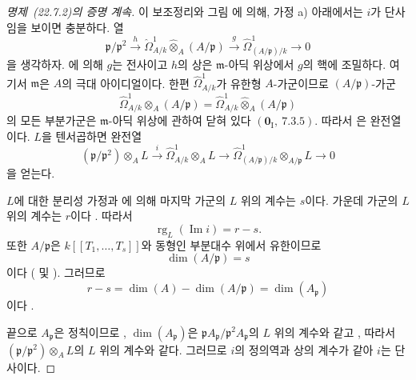 \begin{proof}[명제~{\rm(22.7.2)}의 증명 계속]
이 보조정리와 그림 에 의해, 가정 a) 아래에서는
$i$가 단사임을 보이면 충분하다. 열
\begin{equation}
\label{0.22.7.2.6-ko}
  \mathfrak p/\mathfrak p^2\xrightarrow{h}
  \widehat\Omega^1_{A/k}\widehat\otimes_A(A/\mathfrak p)
  \xrightarrow{g}\widehat\Omega^1_{(A/\mathfrak p)/k}\longrightarrow0
  \tag{22.7.2.6}
\end{equation}
을 생각하자. 에 의해 $g$는 전사이고 $h$의 상은
$\mathfrak m$-아딕 위상에서 $g$의 핵에 조밀하다. 여기서
$\mathfrak m$은 $A$의 극대 아이디얼이다. 한편
$\widehat\Omega^1_{A/k}$가 유한형 $A$-가군이므로
$(A/\mathfrak p)$-가군
\[
  \widehat\Omega^1_{A/k}\otimes_A(A/\mathfrak p)
  =\widehat\Omega^1_{A/k}\widehat\otimes_A(A/\mathfrak p)
\]
의 모든 부분가군은 $\mathfrak m$-아딕 위상에 관하여 닫혀 있다
$(\mathbf 0_{\mathrm I},~7.3.5)$. 따라서
은 완전열이다. $L$을 텐서곱하면 완전열
\[
  (\mathfrak p/\mathfrak p^2)\otimes_AL\xrightarrow{i}
  \widehat\Omega^1_{A/k}\otimes_AL\longrightarrow
  \widehat\Omega^1_{(A/\mathfrak p)/k}\otimes_{A/\mathfrak p}L
  \longrightarrow0
\]
을 얻는다.

$L$에 대한 분리성 가정과 에 의해 마지막 가군의
$L$ 위의 계수는 $s$이다. 가운데 가군의 $L$ 위의 계수는
$r$이다 . 따라서
\[
  \operatorname{rg}_L(\operatorname{Im}i)=r-s.
\]
또한 $A/\mathfrak p$은 $k[[T_1,\ldots,T_s]]$와 동형인 부분대수
위에서 유한이므로
\[
  \dim(A/\mathfrak p)=s
\]
이다 ( 및 ). 그러므로
\[
  r-s=\dim(A)-\dim(A/\mathfrak p)=\dim(A_{\mathfrak p})
\]
이다 .


끝으로 $A_{\mathfrak p}$은 정칙이므로 ,
$\dim(A_{\mathfrak p})$은
$\mathfrak pA_{\mathfrak p}/\mathfrak p^2A_{\mathfrak p}$의 $L$ 위의
계수와 같고 , 따라서
$(\mathfrak p/\mathfrak p^2)\otimes_AL$의 $L$ 위의 계수와 같다.
그러므로 $i$의 정의역과 상의 계수가 같아 $i$는 단사이다.
\end{proof}

